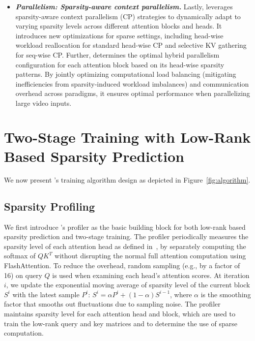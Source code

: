 \begin{itemize}[leftmargin=*]
  \item {\bf \em Parallelism: Sparsity-aware context parallelism.}  
  Lastly, \sys leverages sparsity-aware context parallelism (CP) strategies to dynamically adapt to varying sparsity levels across different attention blocks and heads. It introduces new optimizations for sparse settings, including head-wise workload reallocation for standard head-wise CP and selective KV gathering for seq-wise CP. Further, \sys determines the optimal hybrid parallelism configuration for each attention block based on its head-wise sparsity patterns. By jointly optimizing computational load balancing (mitigating inefficiencies from sparsity-induced workload imbalances) and communication overhead across paradigms, it ensures optimal performance when parallelizing large video inputs.
\end{itemize}










\section{Two-Stage Training with Low-Rank Based Sparsity Prediction}
\label{sec:algorithm}



We now present \sys's training algorithm design as depicted in Figure~\ref{fig:algorithm}.

\subsection{Sparsity Profiling}
\label{sec:profiling}
We first introduce \sys's profiler as the basic building block for both low-rank based sparsity prediction and two-stage training.
The profiler periodically measures the sparsity level of each attention head as defined in~, by separately computing the softmax of $QK^T$ without disrupting the normal full attention computation using FlashAttention. 
To reduce the overhead, random sampling (e.g., by a factor of 16) on query $Q$ is used when examining each head's attention scores. 
At iteration $i$, we update the exponential moving average of sparsity level of the current block $S^{i}$ with the latest sample $P^{i}$: $
S^{i} = \alpha  P^{i} + (1 - \alpha) S^{i-1} $,
where $\alpha$ is the smoothing factor that smooths out fluctuations due to sampling noise.
The profiler maintains sparsity level for each attention head and block, which are used to train the low-rank query and key matrices and to determine the use of sparse computation.







